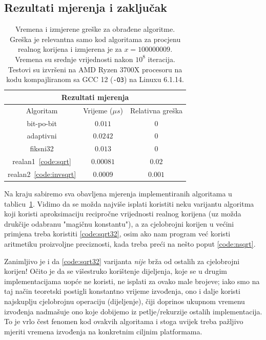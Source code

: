 \documentclass[12pt]{scrartcl}
\begin{document}
\subsection{Rezultati mjerenja i zaključak}
\begin{table}[t]
    \center
    
    \begin{tabular}{|c|c|c|}
    \hline
    \multicolumn{3}{|c|}{\textbf{Rezultati mjerenja}}\\ \hline
    Algoritam & Vrijeme ($\mu s$) & Relativna greška \\ \hline\hline
    bit-po-bit & $0.011$ & $0$ \\ \hline
    adaptivni & $0.0242$ & $0$ \\ \hline
    fiksni32 & $0.013$ & $0$ \\ \hline
    realan1~\eqref{code:sqrt} & $0.00081$ & $0.02$ \\ \hline
    realan2~\eqref{code:invsqrt} & $0.0009$ & $0.001$ \\ \hline
    \end{tabular}
    \caption{Vremena i izmjerene greške za obrađene algoritme. Greška je relevantna samo kod algoritama za procjenu realnog korijena i izmjerena
    je za $x=100000009$. Vremena su srednje vrijednosti nakon $10^8$ iteracija. Testovi su izvršeni na AMD Ryzen 3700X procesoru na kodu kompajliranom
    sa GCC 12 (\texttt{-O3}) na Linuxu 6.1.14.}\label{tbl}
\end{table}
Na kraju sabiremo sva obavljena mjerenja implementiranih algoritama u tablicu~\ref{tbl}. Vidimo da se možda najviše isplati koristiti neku varijantu
algoritma koji koristi aproksimaciju recipročne vrijednosti realnog korijena (uz možda drukčije odabranu "magičnu konstantu"), a za cjelobrojni
korijen u većini primjena treba koristiti \autoref{code:sqrt32}, osim ako nam program već koristi aritmetiku proizvoljne preciznosti, kada
treba preći na nešto poput \autoref{code:nsqrt}.

Zanimljivo je i da \autoref{code:sqrt32} varijanta \emph{nije} brža od ostalih za cjelobrojni korijen! Očito je da se višestruko korištenje dijeljenja, koje se 
u drugim implementacijama uopće ne koristi, ne isplati za ovako male brojeve; iako smo na taj način teoretski postigli konstantno vrijeme izvođenja,
ono i dalje koristi najskuplju cjelobrojnu operaciju (dijeljenje), čiji doprinos ukupnom vremenu izvođenja nadmašuje ono koje dobijemo iz petlje/rekurzije
ostalih implementacija. To je vrlo čest fenomen kod ovakvih algoritama i stoga uvijek treba pažljivo mjeriti vremena izvođenja na konkretnim ciljnim
platformama.
\end{document}
